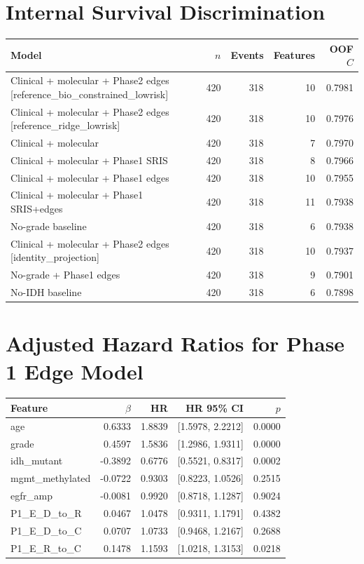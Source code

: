 \documentclass[11pt]{article}
\begin{document}
\section{Internal Survival Discrimination}
\begin{longtable}{p{}rrrr}
\toprule
Model & $n$ & Events & Features & OOF $C$\\
\midrule
Clinical + molecular + Phase2 edges [reference\_bio\_constrained\_lowrisk] & 420 & 318 & 10 & 0.7981\\
Clinical + molecular + Phase2 edges [reference\_ridge\_lowrisk] & 420 & 318 & 10 & 0.7976\\
Clinical + molecular & 420 & 318 & 7 & 0.7970\\
Clinical + molecular + Phase1 SRIS & 420 & 318 & 8 & 0.7966\\
Clinical + molecular + Phase1 edges & 420 & 318 & 10 & 0.7955\\
Clinical + molecular + Phase1 SRIS+edges & 420 & 318 & 11 & 0.7938\\
No-grade baseline & 420 & 318 & 6 & 0.7938\\
Clinical + molecular + Phase2 edges [identity\_projection] & 420 & 318 & 10 & 0.7937\\
No-grade + Phase1 edges & 420 & 318 & 9 & 0.7901\\
No-IDH baseline & 420 & 318 & 6 & 0.7898\\
\bottomrule
\end{longtable}

\section{Adjusted Hazard Ratios for Phase 1 Edge Model}
\begin{longtable}{p{}rrrr}
\toprule
Feature & $\beta$ & HR & HR 95\% CI & $p$\\
\midrule
age & 0.6333 & 1.8839 & [1.5978, 2.2212] & 0.0000\\
grade & 0.4597 & 1.5836 & [1.2986, 1.9311] & 0.0000\\
idh\_mutant & -0.3892 & 0.6776 & [0.5521, 0.8317] & 0.0002\\
mgmt\_methylated & -0.0722 & 0.9303 & [0.8223, 1.0526] & 0.2515\\
egfr\_amp & -0.0081 & 0.9920 & [0.8718, 1.1287] & 0.9024\\
P1\_E\_D\_to\_R & 0.0467 & 1.0478 & [0.9311, 1.1791] & 0.4382\\
P1\_E\_D\_to\_C & 0.0707 & 1.0733 & [0.9468, 1.2167] & 0.2688\\
P1\_E\_R\_to\_C & 0.1478 & 1.1593 & [1.0218, 1.3153] & 0.0218\\
\bottomrule
\end{longtable}
\end{document}
